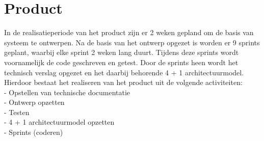 \section{Product}
In de realisatieperiode van het product zijn er 2 weken gepland om de basis van systeem te ontwerpen.
Na de basis van het ontwerp opgezet is worden er 9 sprints geplant, waarbij elke sprint 2 weken lang duurt.
Tijdens deze sprints wordt voornamelijk de code geschreven en getest.
Door de sprints heen wordt het technisch verslag opgezet en het daarbij behorende 4 + 1 architectuurmodel.
Hierdoor bestaat het realiseren van het product uit de volgende activiteiten: \\
- Opstellen van technische documentatie\\
- Ontwerp opzetten \\
- Testen \\
- 4 + 1 architectuurmodel opzetten\\
- Sprints (coderen)
